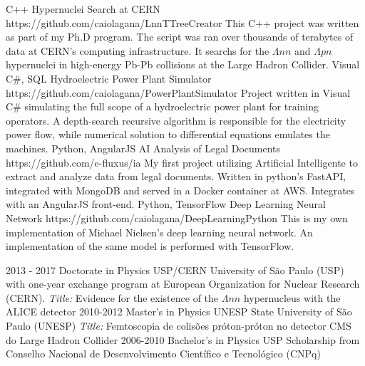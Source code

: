 \documentclass[9pt]{developercv} %
\begin{document}

\vspace{10 pt}
\begin{entrylist}
	\entry
		{C++}
		{Hypernuclei Search at CERN}
		{https://github.com/caiolagana/LnnTTreeCreator}
		{This C++ project was written as part of my Ph.D program. The script was ran over thousands of terabytes of data at CERN's computing infrastructure. It searchs for the $\Lambda nn$ and $\Lambda pn$ hypernuclei in high-energy Pb-Pb collisions at the Large Hadron Collider.}
    \entry
		{Visual C\#, SQL}
		{Hydroelectric Power Plant Simulator}
		{https://github.com/caiolagana/PowerPlantSimulator}
		{Project written in Visual C\# simulating the full scope of a hydroelectric power plant for training operators. A depth-search recursive algorithm is responsible for the electricity power flow, while numerical solution to differential equations emulates the machines.}
    \entry
		{Python, AngularJS}
		{AI Analysis of Legal Documents}
		{https://github.com/e-fluxus/ia}
		{My first project utilizing Artificial Intelligente to extract and analyze data from legal documents. Written in python's FastAPI, integrated with MongoDB and served in a Docker container at AWS. Integrates with an AngularJS front-end.}
	\entry
		{Python, TensorFlow}
		{Deep Learning Neural Network}
		{https://github.com/caiolagana/DeepLearningPython}
		{This is my own implementation of Michael Nielsen's deep learning neural network. An implementation of the same model is performed with TensorFlow.}
\end{entrylist}


\vspace{-10 pt}
\begin{entrylist}
    \entry
		{2013 - 2017}
		{Doctorate in Physics}
		{USP/CERN}
		{University of São Paulo (USP) with one-year exchange program at European Organization for Nuclear Research (CERN). {\it Title:} Evidence for the existence of the $\Lambda nn$ hypernucleus with the ALICE detector}
    \entry
		{2010-2012}
		{Master's in Physics}
		{UNESP}
		{State University of São Paulo (UNESP) {\it Title:} Femtoscopia de colisões próton-próton no detector CMS do Large Hadron Collider}
	\entry
		{2006-2010}
		{Bachelor's in Physics}
		{USP}
		{Scholarship from Conselho Nacional de Desenvolvimento Científico e Tecnológico (CNPq)}
\end{entrylist}
\end{document}
